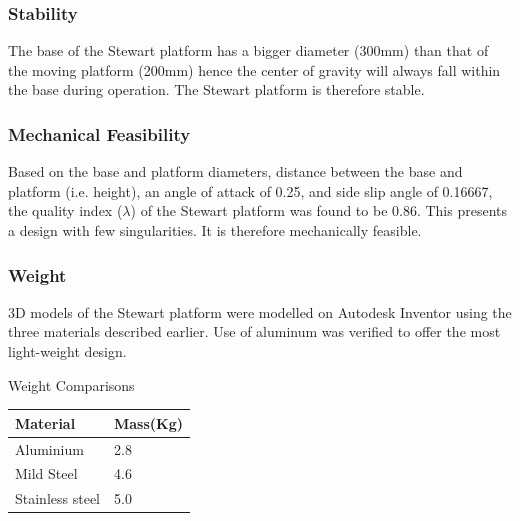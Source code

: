 \subsubsection{Stability}
The base of the Stewart platform has a bigger diameter (300mm) than that of the moving platform (200mm) hence the center of gravity will always fall within the base during operation. The Stewart platform is therefore stable.
\subsubsection{Mechanical Feasibility}
Based on the base and platform diameters, distance between the base and platform (i.e. height), an angle of attack of 0.25, and side slip angle of 0.16667, the quality index ($\lambda$) of the Stewart platform was found to be 0.86. This presents a design with few singularities. It is therefore mechanically feasible.
\subsubsection{Weight}
3D models of the Stewart platform were modelled on Autodesk Inventor using the three materials described earlier. Use of aluminum was verified to offer the most light-weight design.
\begin{table}[H]
	\caption{Weight Comparisons}
\end{table}
\begin{center}
	\begin{tabular}{|l|l|}
		\hline
		\textbf{Material} & \textbf{Mass(Kg)} \\
		\hline
		Aluminium         & 2.8               \\
		\hline
		Mild Steel        & 4.6               \\
		\hline
		Stainless steel   & 5.0               \\
		\hline
	\end{tabular}
\end{center}
